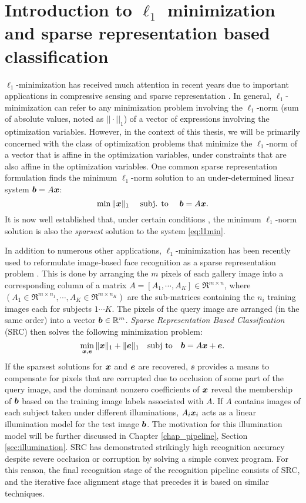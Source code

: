 \section{Introduction to $\ell_1$ minimization and sparse representation based classification}
%
$\ell_1$-minimization has received much attention in recent years due to
important applications in compressive sensing \cite{BrucksteinA2007} and sparse
representation \cite{WrightJ2010-PIEEE}.  
In general, $\ell_1$-minimization can refer to any minimization problem involving the 
$\ell_1$-norm (sum of absolute values, noted as $||\cdot||_1$) of a vector of expressions involving the optimization
variables. However, in the context of this thesis, we will be primarily concerned with
the class of optimization problems that minimize the $\ell_1$-norm of a vector that
is affine in the optimization variables, under constraints that are also affine in the optimization variables.
One common sparse representation formulation finds the minimum $\ell_1$-norm solution to an
under-determined linear system $\boldsymbol{b}=A{\boldsymbol{x}}$:
%
\begin{equation} \min \|{\boldsymbol{x}}\|_1\quad \mbox{ subj. to }\quad \boldsymbol{b} = A{\boldsymbol{x}}.
\label{eq:l1min} \end{equation}
%
It is now well established that, under certain conditions
\cite{CandesE2005-IT_1,DonohoD2004}, the minimum $\ell_1$-norm solution is also
the \emph{sparsest} solution to the system \eqref{eq:l1min}.

In addition to numerous other applications, $\ell_1$-minimization has been 
recently used to reformulate image-based face recognition as a sparse representation problem
\cite{WrightJ2009-PAMI}.  This is done by arranging the $m$ pixels of each gallery image into a corresponding
column of a matrix 
$A = [A_1, \cdots, A_K]\in\Re^{m\times n}$,
where 
$(A_1\in\Re^{m\times n_1}, \cdots, A_K\in\Re^{m\times n_K})$
are the sub-matrices containing 
the $n_i$ training images each for subjects $1 \cdots K$.
The pixels of the query image are arranged (in the same order) into a vector $\boldsymbol{b}\in\mathbb R^m$. 
\emph{Sparse Representation Based
Classification} (SRC) then solves the following minimization problem:
\begin{equation}
\min_{{\boldsymbol{x}}, {\boldsymbol{e}}} \| {\boldsymbol{x}} \|_1 + \|{\boldsymbol{e}}\|_1 \quad \textup{subj to} \quad \boldsymbol{b} = A {\boldsymbol{x}} + {\boldsymbol{e}}.
\label{eq:l1min_denoise}
\end{equation}
If the sparsest solutions for ${\boldsymbol{x}}$ and $\boldsymbol{e}$ are recovered, $\ee$ provides a
means to compensate for pixels that are corrupted due to occlusion of some part of the query
image, and the dominant nonzero coefficients of ${\boldsymbol{x}}$ reveal the membership of
$\boldsymbol{b}$ based on the training image labels associated with $A$. 
If $A$ contains images of each subject taken under different illuminations, 
$A_i{\boldsymbol{x}}_i$ acts as a linear illumination model for the test image $\boldsymbol{b}$.  The motivation
for this illumination model will be further discussed in Chapter \ref{chap_pipeline}, Section \ref{sec:illumination}.
SRC has demonstrated strikingly high recognition accuracy
despite severe occlusion or corruption by solving a simple convex program.  For
this reason, the final recognition stage of the recognition pipeline consists of
SRC, and the iterative face alignment stage that precedes it is based on
similar techniques.

